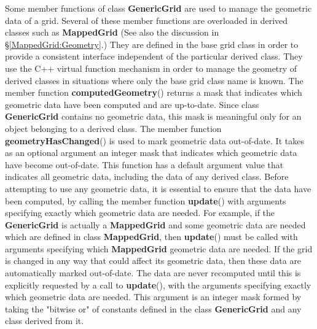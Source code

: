 \documentclass{article}
\begin{document}
Some member functions of class \textbf{GenericGrid} are used to
manage the geometric data of a grid.  Several of these member functions
are overloaded in derived classes such as \textbf{MappedGrid} (See also
the discussion in \S\ref{MappedGrid:Geometry}.)  They are defined in the
base grid class in order to provide a consistent interface independent of
the particular derived class.  They use the C++ virtual function mechanism
in order to manage the geometry of derived classes in situations where only
the base grid class name is known.  The member function
\textbf{computedGeometry}() returns a mask that indicates which geometric
data have been computed and are up-to-date.  Since class
\textbf{GenericGrid} contains no geometric data, this mask is meaningful
only for an object belonging to a derived class.  The member function
\textbf{geometryHasChanged}() is used to mark geometric data out-of-date.
It takes as an optional argument an integer mask that indicates which
geometric data have become out-of-date.  This
function has a default argument value that indicates all geometric data,
including the data of any derived class.  Before attempting to use any
geometric data, it is essential to ensure that the data
have been computed, by calling the member function \textbf{update}()
with arguments specifying exactly which geometric data are needed.
For example, if the \textbf{GenericGrid} is actually a
\textbf{MappedGrid} and some geometric data are needed which are defined
in class \textbf{MappedGrid}, then \textbf{update}() must be called
with arguments specifying which \textbf{MappedGrid} geometric data are
needed.  If the grid is changed in any way that could affect its
geometric data, then these data are automatically marked out-of-date.  The
data are never recomputed until this is explicitly requested by a call to
\textbf{update}(), with the arguments specifying exactly which
geometric data are needed.  This argument is an integer
mask formed by taking the "bitwise or" of constants defined in the
class \textbf{GenericGrid} and any class derived from
it.
\end{document}
